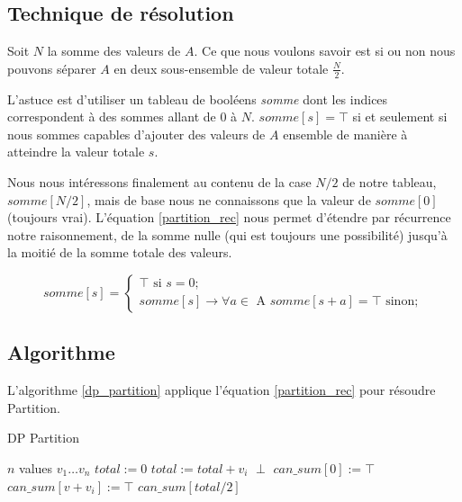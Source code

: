 \subsection{Technique de résolution}

Soit $N$ la somme des valeurs de $A$. Ce que nous voulons savoir est
si ou non nous pouvons séparer $A$ en deux sous-ensemble de valeur
totale $\frac{N}{2}$.

L'astuce est d'utiliser un tableau de booléens \emph{somme} dont les
indices correspondent à des sommes allant de $0$ à $N$. $somme[s] =
\top$ si et seulement si nous sommes capables d'ajouter des valeurs de
$A$ ensemble de manière à atteindre la valeur totale $s$.

Nous nous intéressons finalement au contenu de la case $N/2$ de notre
tableau, $somme[N/2]$, mais de base nous ne connaissons que la valeur
de $somme[0]$ (toujours vrai). L'équation \ref{partition_rec} nous
permet d'étendre par récurrence notre raisonnement, de la somme nulle
(qui est toujours une possibilité) jusqu'à la moitié de la somme
totale des valeurs.

\begin{equation}
\label{partition_rec}
somme[s] = 
\begin{cases}
\top \text{ si } s = 0; \\
somme[s] \rightarrow \forall a \in \text{ A } somme[s + a] = \top \text{ sinon} ;
\end{cases}
\end{equation}

\subsection{Algorithme}
L'algorithme \ref{dp_partition} applique l'équation
\ref{partition_rec} pour résoudre Partition.


\begin{algorithm}[!ht]
\caption{DP Partition}
\label{dp_partition}
\begin{algorithmic}[1]
\REQUIRE $n$ values $v_1 \dots v_n$
\STATE $total := 0$
	\STATE $total := total + v_i$
\ENDFOR
{}
	\RETURN $\perp$
\ENDIF
\STATE $can\_sum[0] := \top$ 
			\STATE $can\_sum[v + v_i] := \top$
		\ENDIF
	\ENDFOR
\ENDFOR
\RETURN $can\_sum[total/2]$
\end{algorithmic}
\end{algorithm}

